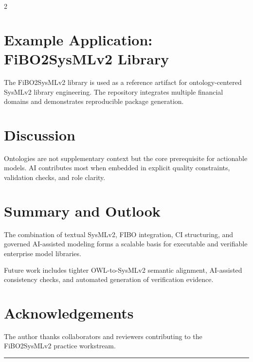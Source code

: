 \documentclass{book}
\theoremstyle{remark}
\begin{document}
\begin{multicols}{2}
\section{Example Application: FiBO2SysMLv2 Library}
The FiBO2SysMLv2 library is used as a reference artifact for ontology-centered SysMLv2 library engineering. The repository integrates multiple financial domains and demonstrates reproducible package generation.

\section{Discussion}
Ontologies are not supplementary context but the core prerequisite for actionable models. AI contributes most when embedded in explicit quality constraints, validation checks, and role clarity.

\section{Summary and Outlook}
The combination of textual SysMLv2, FIBO integration, CI structuring, and governed AI-assisted modeling forms a scalable basis for executable and verifiable enterprise model libraries.

Future work includes tighter OWL-to-SysMLv2 semantic alignment, AI-assisted consistency checks, and automated generation of verification evidence.

\section*{Acknowledgements}
The author thanks collaborators and reviewers contributing to the FiBO2SysMLv2 practice workstream.

\parskip=5pt
\noindent \rule[0pt]{25em}{1pt}

\parskip=10pt
\vspace{-6pt}
\renewcommand{\bibsection}{}



\end{multicols}
\end{document}
